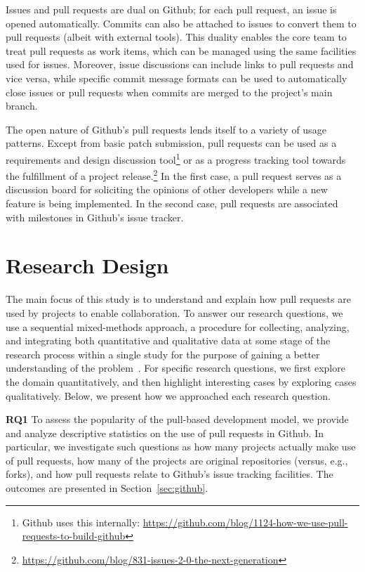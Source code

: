 \documentclass{sig-alternate}
\begin{document}
Issues and pull requests are dual on Github; for each pull request, an issue is
opened automatically. Commits can also be attached to issues to convert them to
pull requests (albeit with external tools). This duality enables the core team
to treat pull requests as work items, which can be managed using the same
facilities used for issues. Moreover, issue discussions can include links to
pull requests and vice versa, while specific commit message formats can be used 
to automatically close issues or pull requests when commits are
merged to the project's main branch.

The open nature of Github's pull requests lends itself to a variety of usage
patterns. Except from basic patch submission, pull requests can be used as a
requirements and design discussion tool\footnote{Github uses this internally:
\url{https://github.com/blog/1124-how-we-use-pull-requests-to-build-github}} or
as a progress tracking tool towards the fulfillment of a project
release.\footnote{\url{https://github.com/blog/831-issues-2-0-the-next-generation}} In
the first case, a pull request serves as a discussion board for soliciting the
opinions of other developers while a new feature is being implemented. In the
second case, pull requests are associated with milestones in Github's issue
tracker.

\section{Research Design}
\label{sec:resdesign}

The main focus of this study is to understand and explain how pull requests are
used by projects to enable collaboration. To answer our research questions, we
use a sequential mixed-methods approach, a procedure for
collecting, analyzing, and integrating both quantitative and qualitative data at
some stage of the research process within a single study for the purpose of
gaining a better understanding of the problem~\cite{Ivank06}. For specific 
research questions, we first explore the domain quantitatively,
and then highlight interesting cases by exploring cases qualitatively.
Below, we present how we approached each research question.

{\bfseries RQ1} To assess the popularity of the pull-based development model, we
provide and analyze descriptive statistics on the use of pull requests in Github.
In particular, we investigate such questions as how many projects actually make
use of pull requests, how many of the projects are original repositories
(versus, e.g., forks), and how pull requests relate to Github's issue tracking
facilities. The outcomes are presented in Section~\ref{sec:github}.
\end{document}
